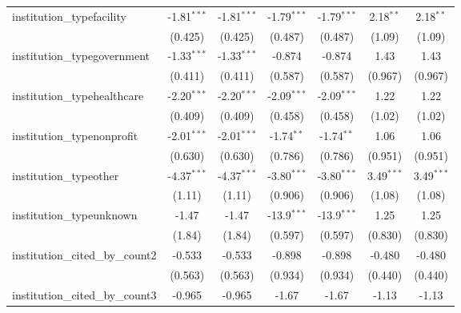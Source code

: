 \begin{tabular}{lcccccc}
   institution\_typefacility             & -1.81$^{***}$ & -1.81$^{***}$ & -1.79$^{***}$ & -1.79$^{***}$ & 2.18$^{**}$   & 2.18$^{**}$\\   
                                         & (0.425)       & (0.425)       & (0.487)       & (0.487)       & (1.09)        & (1.09)\\   
   institution\_typegovernment           & -1.33$^{***}$ & -1.33$^{***}$ & -0.874        & -0.874        & 1.43          & 1.43\\   
                                         & (0.411)       & (0.411)       & (0.587)       & (0.587)       & (0.967)       & (0.967)\\   
   institution\_typehealthcare           & -2.20$^{***}$ & -2.20$^{***}$ & -2.09$^{***}$ & -2.09$^{***}$ & 1.22          & 1.22\\   
                                         & (0.409)       & (0.409)       & (0.458)       & (0.458)       & (1.02)        & (1.02)\\   
   institution\_typenonprofit            & -2.01$^{***}$ & -2.01$^{***}$ & -1.74$^{**}$  & -1.74$^{**}$  & 1.06          & 1.06\\   
                                         & (0.630)       & (0.630)       & (0.786)       & (0.786)       & (0.951)       & (0.951)\\   
   institution\_typeother                & -4.37$^{***}$ & -4.37$^{***}$ & -3.80$^{***}$ & -3.80$^{***}$ & 3.49$^{***}$  & 3.49$^{***}$\\   
                                         & (1.11)        & (1.11)        & (0.906)       & (0.906)       & (1.08)        & (1.08)\\   
   institution\_typeunknown              & -1.47         & -1.47         & -13.9$^{***}$ & -13.9$^{***}$ & 1.25          & 1.25\\   
                                         & (1.84)        & (1.84)        & (0.597)       & (0.597)       & (0.830)       & (0.830)\\   
   institution\_cited\_by\_count2        & -0.533        & -0.533        & -0.898        & -0.898        & -0.480        & -0.480\\   
                                         & (0.563)       & (0.563)       & (0.934)       & (0.934)       & (0.440)       & (0.440)\\   
   institution\_cited\_by\_count3        & -0.965        & -0.965        & -1.67         & -1.67         & -1.13         & -1.13\\   

\end{tabular}
